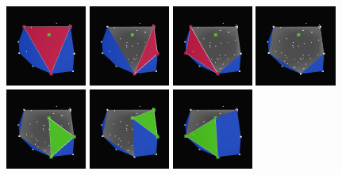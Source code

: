 \documentclass[]{article}
\begin{document}
\begin{figure}[H]
	\includegraphics[width=2.65cm]{qh3d/demo3d/add_rem_10.png}
	\includegraphics[width=2.65cm]{qh3d/demo3d/add_rem_9.png}
	\includegraphics[width=2.65cm]{qh3d/demo3d/add_rem_8.png}
	\includegraphics[width=2.65cm]{qh3d/demo3d/add_rem_7.png}
	\includegraphics[width=2.65cm]{qh3d/demo3d/add_rem_6.png}
	\includegraphics[width=2.65cm]{qh3d/demo3d/add_rem_5.png}
	\includegraphics[width=2.65cm]{qh3d/demo3d/add_rem_4.png}

\end{figure}
\end{document}
